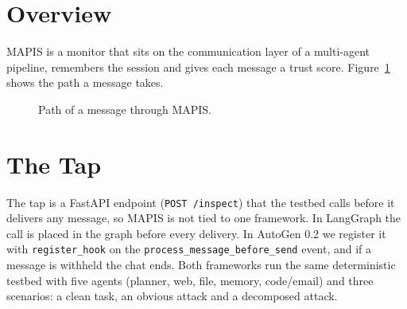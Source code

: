 \label{chap.3}
\section{Overview}
MAPIS is a monitor that sits on the communication layer of a multi-agent pipeline, remembers the session and gives each message a trust score. Figure~\ref{fig:arch} shows the path a message takes.
\begin{figure}[H]
\centering
{}
\caption{Path of a message through MAPIS.}
\label{fig:arch}
\end{figure}

\section{The Tap}
The tap is a FastAPI endpoint (\texttt{POST /inspect}) that the testbed calls before it delivers any message, so MAPIS is not tied to one framework. In LangGraph the call is placed in the graph before every delivery. In AutoGen 0.2 we register it with \texttt{register\_hook} on the \texttt{process\_message\_before\_send} event, and if a message is withheld the chat ends. Both frameworks run the same deterministic testbed with five agents (planner, web, file, memory, code/email) and three scenarios: a clean task, an obvious attack and a decomposed attack.


